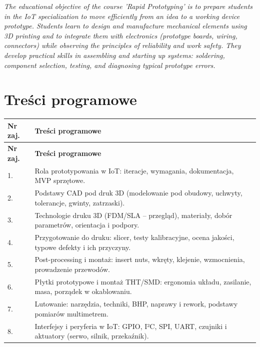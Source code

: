 \documentclass[12pt, a4paper]{article}
\newcommand{\thdrule}{\noalign{\global\setlength{\extrarowheight}{0pt}}}
\newcommand{\thdend}{\noalign{\global\setlength{\extrarowheight}{3pt}}}
\begin{document}
\textit{The educational objective of the course 'Rapid Prototyping' is to prepare students in the IoT specialization to move efficiently from an idea to a working device prototype. Students learn to design and manufacture mechanical elements using 3D printing and to integrate them with electronics (prototype boards, wiring, connectors) while observing the principles of reliability and work safety. They develop practical skills in assembling and starting up systems: soldering, component selection, testing, and diagnosing typical prototype errors.}


\section{Treści programowe}

{\scriptsize
\begin{longtable}{m{1.5cm}m{14.5cm}}
\thdrule\toprule
\rowcolor{pjatkRed} {\color{white}\textbf{Nr zaj.}} & {\color{white}\textbf{Treści programowe}} \\
\midrule\thdend
\endfirsthead
\thdrule\toprule
\rowcolor{pjatkRed} {\color{white}\textbf{Nr zaj.}} & {\color{white}\textbf{Treści programowe}} \\
\midrule\thdend
\endhead
  \rowcolor{tableRowLight} 1. & Rola prototypowania w IoT: iteracje, wymagania, dokumentacja, MVP sprzętowe. \\
  \rowcolor{tableRowAlt} 2. & Podstawy CAD pod druk 3D (modelowanie pod obudowy, uchwyty, tolerancje, gwinty, zatrzaski). \\
  \rowcolor{tableRowLight} 3. & Technologie druku 3D (FDM/SLA – przegląd), materiały, dobór parametrów, orientacja i podpory. \\
  \rowcolor{tableRowAlt} 4. & Przygotowanie do druku: slicer, testy kalibracyjne, ocena jakości, typowe defekty i ich przyczyny. \\
  \rowcolor{tableRowLight} 5. & Post-processing i montaż: insert nuts, wkręty, klejenie, wzmocnienia, prowadzenie przewodów. \\
  \rowcolor{tableRowAlt} 6. & Płytki prototypowe i montaż THT/SMD: ergonomia układu, zasilanie, masa, porządek w okablowaniu. \\
  \rowcolor{tableRowLight} 7. & Lutowanie: narzędzia, techniki, BHP, naprawy i rework, podstawy pomiarów multimetrem. \\
  \rowcolor{tableRowAlt} 8. & Interfejsy i peryferia w IoT: GPIO, I²C, SPI, UART, czujniki i aktuatory (serwo, silnik, przekaźnik). \\

\end{longtable}}
\end{document}
